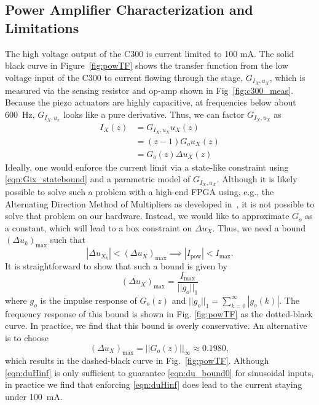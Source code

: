 \documentclass[twocolumn,twoside]{IEEEtran}
\begin{document}
\subsection{Power Amplifier Characterization and Limitations}\label{sec:powcharct}
The high voltage output of the C300 is current limited to 100 mA. The solid black curve in Figure~\ref{fig:powTF} shows the transfer function from the low voltage input of the C300 to current flowing through the stage, $G_{I_X,u_X}$, which is measured via the sensing resistor and op-amp shown in Fig~\ref{fig:c300_meas}. Because the piezo actuators are highly capacitive, at frequencies below about 600~Hz, $G_{I_X,u_x}$ looks like a pure derivative.
Thus, we can factor $G_{I_X,u_X}$ as
\begin{align}
  I_{X}(z) &= G_{I_X,u_X} u_X(z)\label{eqn:Gix_statebound}\\
          & = (z-1) G_o u_X(z)\nonumber\\
          & = G_o(z) \Delta u_X(z) \label{eqn:Gostatebound}
\end{align}
Ideally, one would enforce the current limit via a state-like constraint using \eqref{eqn:Gix_statebound} and a parametric model of $G_{I_X,u_X}$.
Although it is likely possible to solve such a problem with a high-end FPGA using, e.g., the Alternating Direction Method of Multipliers as developed in~\cite{Jerez_Trans_2014}, it is not possible to solve that problem on our hardware. Instead, we would like to approximate $G_o$ as a constant, which will lead to a box constraint on $\Delta u_X$. Thus, we need a bound $(\Delta u_k)_{\text{max}}$ such that
\begin{equation}
  |\Delta u_{X_k}| < (\Delta u_X)_{\text{max}} \implies |I_{\text{pow}}| < I_{\text{max}}.\label{eqn:du_bound0}
\end{equation}
It is straightforward to show that such a bound is given by 
\begin{equation}
(\Delta u_X)_{\text{max}} = \frac{I_{\text{max}}}{||g_o||_1}\label{eqn:h1bound}
\end{equation}
where $g_o$ is the impulse response of $G_o(z)$ and ${||g_o||_1 = \sum_{k=0}^{\infty}|g_o(k)|}$. The frequency response of this bound is shown in Fig. \ref{fig:powTF} as the dotted-black curve. In practice, we find that this bound is overly conservative. An alternative is to choose
\begin{equation}
(\Delta u_X)_{\text{max}} = ||G_o(z)||_{\infty}\approx 0.1980, \label{eqn:duHinf}
\end{equation}
which results in the dashed-black curve in Fig.~\ref{fig:powTF}. Although \eqref{eqn:duHinf} is only sufficient to guarantee \eqref{eqn:du_bound0} for sinusoidal inputs, in practice we find that enforcing \eqref{eqn:duHinf} does lead to the current staying under 100~mA.
\end{document}
